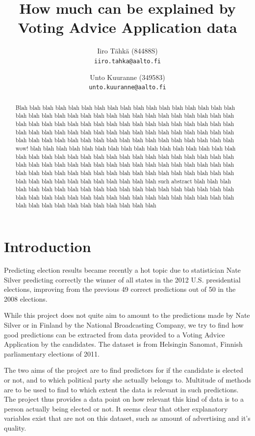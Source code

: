 \documentclass[a4paper,10pt]{article}
\title{How much can be explained by Voting Advice Application data}
\author{
        Iiro Tähkä (84488S)\\ 
       {\tt iiro.tahka@aalto.fi}
        \and          
        Unto Kuuranne (349583)\\ 
       {\tt unto.kuuranne@aalto.fi}
}
\begin{document}
\maketitle

\begin{abstract}
Blah blah blah blah blah blah blah blah blah blah blah blah blah blah blah blah blah blah blah blah blah blah blah blah blah blah blah blah blah blah blah blah blah blah blah blah blah blah blah blah blah blah blah blah blah blah blah blah blah blah blah blah blah blah blah blah blah blah blah blah blah blah blah blah blah blah blah blah blah blah blah blah blah blah blah blah blah blah blah blah blah blah blah blah blah wow! blah blah blah blah blah blah blah blah blah blah blah blah blah blah blah blah blah blah blah blah blah blah blah blah blah blah blah blah blah blah blah blah blah blah blah blah blah blah blah blah blah blah blah blah blah blah blah blah blah blah blah blah blah blah blah blah blah blah blah blah blah blah blah blah blah blah blah blah blah blah blah blah blah blah blah blah blah blah such abstract  blah blah blah blah blah blah blah blah blah blah blah blah blah blah blah blah blah blah blah blah blah blah blah blah blah blah blah blah blah blah blah blah blah blah blah blah blah blah blah blah blah blah blah blah blah blah blah blah
\end{abstract}


\section{Introduction}
Predicting election results became recently a hot topic due to statistician Nate Silver predicting correctly the winner of all states in the 2012 U.S. presidential elections, improving from the previous 49 correct predictions out of 50 in the 2008 elections.

While this project does not quite aim to amount to the predictions made by Nate Silver or in Finland by the National Broadcasting Company, we try to find how good predictions can be extracted from data provided to a Voting Advice Application by the candidates. The dataset is from Helsingin Sanomat, Finnish parliamentary elections of 2011.

The two aims of the project are to find predictors for if the candidate is elected or not, and to which political party she actually belongs to. Multitude of methods are to be used to find to which extent the data is relevant in such predictions.
The project thus provides a data point on how relevant this kind of data is to a person actually being elected or not. It seems clear that other explanatory variables exist that are not on this dataset, such as amount of advertising and it’s quality.
\end{document}
